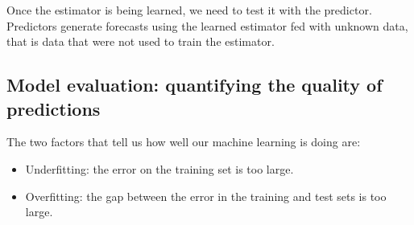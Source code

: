 \documentclass[11pt]{article}
\begin{document}
Once the estimator is being learned, we need to test it with the predictor. Predictors generate forecasts using the learned estimator fed with unknown  data, that is data that were not used to train the estimator.


\subsection{Model evaluation: quantifying the quality of predictions }
The two factors that tell us how well our machine learning is doing are:
\begin{itemize}
\item Underfitting: the error on the training set is too large.
\item Overfitting: the gap between the error in the training and test sets is too large. 
\end{itemize}
\end{document}
